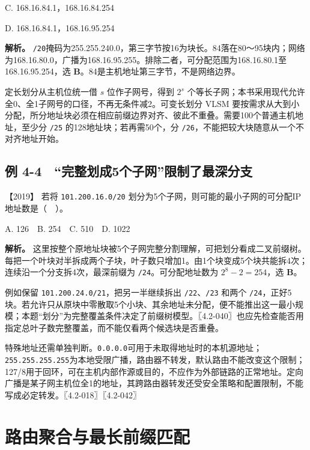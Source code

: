 C. 168.16.84.1，168.16.84.254

D. 168.16.84.1，168.16.95.254


\textbf{解析。} \allowbreak{}\texttt{/20}掩码为255.255.240.0，第三字节按16为块长。84落在80～95块内；网络为168.16.80.0，广播为168.16.95.255。排除二者，可分配范围为168.16.80.1至168.16.95.254，选 \textbf{B}。84是主机地址第三字节，不是网络边界。

定长划分从主机位统一借 \(s\) 位作子网号，得到 \(2^s\) 个等长子网；本书采用现代允许全0、全1子网号的口径，不再无条件减2。可变长划分 VLSM 要按需求从大到小分配，所分地址块必须在相应前缀边界对齐、彼此不重叠。需要100个普通主机地址，至少分 \allowbreak{}\texttt{/25} 的128地址块；若再需50个，分 \allowbreak{}\texttt{/26}，不能把较大块随意从一个不对齐地址开始。

\subsection{例 4-4　``完整划成5个子网''限制了最深分支}\label{cn-ex4-4}

\noindent{}【2019】 若将 \allowbreak{}\texttt{101.200.16.0/20} 划分为5个子网，则可能的最小子网的可分配IP地址数是（　）。

A. 126　B. 254　C. 510　D. 1022


\textbf{解析。} 这里按整个原地址块被5个子网完整分割理解，可把划分看成二叉前缀树。每把一个叶块对半拆成两个子块，叶子数只增加1。由1个块变成5个块共能拆4次；连续沿一个分支拆4次，最深前缀为 \allowbreak{}\texttt{/24}。可分配地址数为 \(2^8-2=254\)，选 \textbf{B}。

例如保留 \allowbreak{}\texttt{101.200.24.0/21}，把另一半继续拆出 \allowbreak{}\texttt{/22}、\allowbreak{}\texttt{/23} 和两个 \allowbreak{}\texttt{/24}，正好5块。若允许只从原块中零散取5个小块、其余地址未分配，便不能推出这一最小规模；本题``划分''为完整覆盖条件决定了前缀树模型。〖4.2-040〗也应先检查能否用指定总叶子数完整覆盖，而不能仅看两个候选块是否重叠。

特殊地址还需单独判断。\allowbreak{}\texttt{0.0.0.0}可用于未取得地址时的本机源地址；\allowbreak{}\texttt{255.255.255.255}为本地受限广播，路由器不转发，默认路由不能改变这个限制；127/8用于回环，可在主机内部作源或目的，不应作为外部链路的正常地址。定向广播是某子网主机位全1的地址，其跨路由器转发还受安全策略和配置限制，不能写成必定转发。〖4.2-018〗〖4.2-042〗

\section{路由聚合与最长前缀匹配}\label{cn-04-09}


